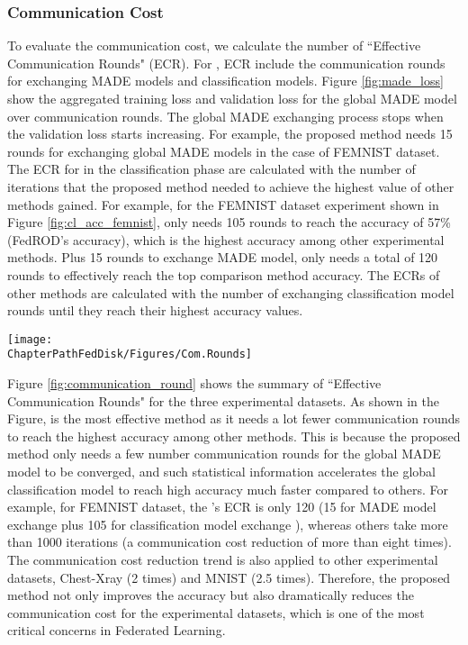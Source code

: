 \subsubsection{Communication Cost}
To evaluate the communication cost, we calculate the number of ``Effective Communication Rounds" (ECR). For \MethodnameShort{}, ECR include the communication rounds for exchanging MADE models and classification models. Figure \ref{fig:made_loss} show the aggregated training loss and validation loss for the global MADE model over communication rounds. The global MADE exchanging process stops when the validation loss starts increasing. For example, the proposed method needs 15 rounds for exchanging global MADE models in the case of FEMNIST dataset. The ECR for \MethodnameShort{} in the classification phase are calculated with the number of iterations that the proposed method needed to achieve the highest value of other methods gained. For example, for the FEMNIST dataset experiment shown in Figure \ref{fig:cl_acc_femnist}, \MethodnameShort{} only needs 105 rounds to reach the accuracy of 57\% (FedROD's accuracy), which is the highest accuracy among other experimental methods. Plus 15 rounds to exchange MADE model, \MethodnameShort{} only needs a total of 120 rounds to effectively reach the top comparison method accuracy. The ECRs of other methods are calculated with the number of exchanging classification model rounds until they reach their highest accuracy values.  

\begin{figure*}[ht!]
	\centering
	\texttt{[image: \\ChapterPathFedDisk/Figures/Com.Rounds]}
	\caption[Summary of effective communication rounds.]{Summary of ``Effective Communication Rounds" over 3 datasets. The Figure shows that \MethodnameShort{} is much more efficient in terms of communication cost.}	
	\label{fig:communication_round}
\end{figure*}


Figure \ref{fig:communication_round} shows the summary of ``Effective Communication Rounds" for the three experimental datasets. As shown in the Figure, \MethodnameShort{} is the most effective method as it needs a lot fewer communication rounds to reach the highest accuracy among other methods. This is because the proposed method only needs a few number communication rounds for the global MADE model to be converged, and such statistical information accelerates the global classification model to reach high accuracy much faster compared to others. For example, for FEMNIST dataset, the \MethodnameShort{}'s ECR is only 120 (15 for MADE model exchange plus 105 for classification model exchange ), whereas others take more than 1000 iterations (a communication cost reduction of more than eight times). The communication cost reduction trend is also applied to other experimental datasets, Chest-Xray (2 times) and MNIST (2.5 times). Therefore, the proposed method not only improves the accuracy but also dramatically reduces the communication cost for the experimental datasets, which is one of the most critical concerns in Federated Learning.


